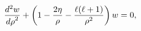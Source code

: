 \[\frac{{d}^{2}w}{{d\rho}^{2}}+\left(1-\frac{2\eta}{\rho}-\frac{\ell(\ell+1)}{%
\rho^{2}}\right)w=0,\]